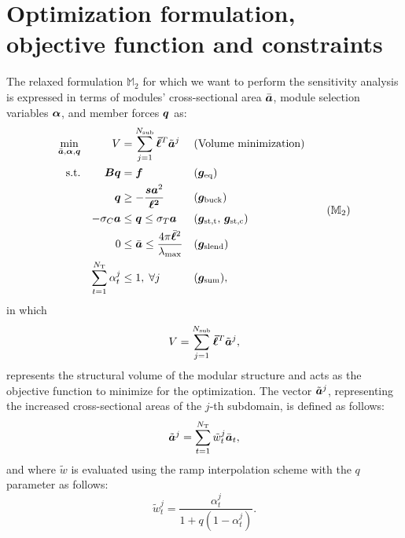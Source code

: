 \section{Optimization formulation, objective function and constraints}
The relaxed formulation $\mathbb{M}_2$ for which we want to perform the sensitivity analysis is expressed in terms of modules' cross-sectional area $\bar{\bm{a}}$, module selection variables $\bm{\alpha}$, and member forces $\bm{q}$ as:
\begin{equation}
    \begin{aligned}
    \min_{\bar{\vect{a}}, \vect{\alpha}, \bm{q}}   && V &= \sum_{j=1}^{N_{\text{sub}}}\vect{\bar{\ell}}^T\tilde{\vect{a}}^j && \text{(Volume minimization)}\\
    \text{s.t.}   && \bm{B}\bm{q} &= \bm{f} && (\vect{g}_\text{eq})\\
                    && \bm{q} &\geq -\frac{\bm{s}\bm{a}^2}{\bm{\ell^2}} && (\vect{g}_\text{buck}) \\
                    && -\sigma_C\bm{a} &\leq \bm{q} \leq \sigma_T\bm{a} && (\vect{g}_\text{st,t},\,\vect{g}_\text{st,c}) \\
                    && 0 &\leq \bar{\vect{a}} \leq \frac{4 \pi \bar{\vect{\ell}}^2}{\lambda_{\text{max}}} && (\vect{g}_\text{slend}) \\
                    && \sum_{t=1}^{N_\text{T}} \alpha_t^j &\leq 1, \; \forall j && (\vect{g}_\text{sum}), \\
    \end{aligned}
    \tag{$\mathbb{M}_2$}
\end{equation}
in which 
\begin{equation}
    V = \sum_{j=1}^{N_{\text{sub}}}\bm{\bar{\ell}}^T\tilde{\bm{a}}^j,
\end{equation}
represents the structural volume of the modular structure and acts as the objective function to minimize for the optimization. The vector $\tilde{\bm{a}}^j$, representing the increased cross-sectional areas of the $j$-th subdomain, is defined as follows:
\begin{equation}
    \tilde{\bm{a}}^j = \sum_{t=1}^{N_\text{T}} \tilde{w}_t^j \bar{\bm{a}}_t, 
\end{equation}
and where $\tilde{w}$ is evaluated using the \gls{ramp} interpolation scheme with the $q$ parameter as follows:
\begin{equation}
    \tilde{w}_t^j = \frac{\alpha_t^j}{1+q(1-\alpha_t^j)}.    
\end{equation}
